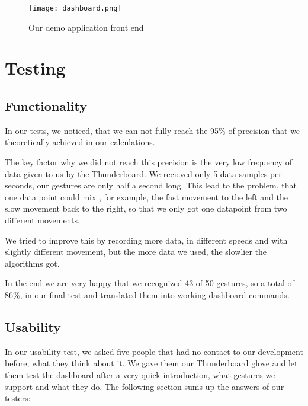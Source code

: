 \begin{figure}[htp]
\begin{center}
  \texttt{[image: dashboard.png]}
\caption{Our demo application front end}
\end{center}
\end{figure} 


\chapter{Testing}
\label{ch:Tests}

\section{Functionality}
\label{ch:Results:sec:Functionality}

In our tests, we noticed, that we can not fully reach the 95\% of precision that we theoretically achieved in our calculations.

The key factor why we did not reach this precision is the very low frequency of data given to us by the Thunderboard.
We recieved only 5 data samples per seconds, our gestures are only half a second long.
This lead to the problem, that one data point could mix , for example, the fast movement to the left and the slow movement back to the right, so that we only got one datapoint from two different movements.

We tried to improve this by recording more data, in different speeds and with slightly different movement, but the more data we used, the slowlier the algorithms got.

In the end we are very happy that we recognized 43 of 50 gestures, so a total of 86\%, in our final test and translated them into working dashboard commands.

\section{Usability}
\label{ch:Results:sec:Usability}

In our usability test, we asked five people that had no contact to our development before, what they think about it.
We gave them our Thunderboard glove and let them test the dashboard after a very quick introduction, what gestures we support and what they do.
The following section sums up the answers of our testers:

